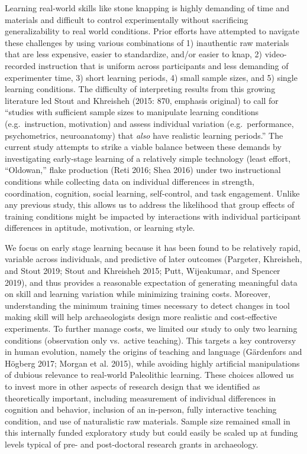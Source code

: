 \documentclass[smallextended]{svjour3}       %
\begin{document}
Learning real-world skills like stone knapping is highly demanding of
time and materials and difficult to control experimentally without
sacrificing generalizability to real world conditions. Prior efforts
have attempted to navigate these challenges by using various
combinations of 1) inauthentic raw materials that are less expensive,
easier to standardize, and/or easier to knap, 2) video-recorded
instruction that is uniform across participants and less demanding of
experimenter time, 3) short learning periods, 4) small sample sizes, and
5) single learning conditions. The difficulty of interpreting results
from this growing literature led Stout and Khreisheh (2015: 870,
emphasis original) to call for ``studies with sufficient sample sizes to
manipulate learning conditions (e.g.~instruction, motivation) and assess
individual variation (e.g.~performance, psychometrics, neuroanatomy)
that \emph{also} have realistic learning periods.'' The current study
attempts to strike a viable balance between these demands by
investigating early-stage learning of a relatively simple technology
(least effort, ``Oldowan,'' flake production (Reti 2016; Shea 2016)
under two instructional conditions while collecting data on individual
differences in strength, coordination, cognition, social learning,
self-control, and task engagement. Unlike any previous study, this
allows us to address the likelihood that group effects of training
conditions might be impacted by interactions with individual participant
differences in aptitude, motivation, or learning style.

We focus on early stage learning because it has been found to be
relatively rapid, variable across individuals, and predictive of later
outcomes (Pargeter, Khreisheh, and Stout 2019; Stout and Khreisheh 2015;
Putt, Wijeakumar, and Spencer 2019), and thus provides a reasonable
expectation of generating meaningful data on skill and learning
variation while minimizing training costs. Moreover, understanding the
minimum training times necessary to detect changes in tool making skill
will help archaeologists design more realistic and cost-effective
experiments. To further manage costs, we limited our study to only two
learning conditions (observation only vs.~active teaching). This targets
a key controversy in human evolution, namely the origins of teaching and
language (Gärdenfors and Högberg 2017; Morgan et al. 2015), while
avoiding highly artificial manipulations of dubious relevance to
real-world Paleolithic learning. These choices allowed us to invest more
in other aspects of research design that we identified as theoretically
important, including measurement of individual differences in cognition
and behavior, inclusion of an in-person, fully interactive teaching
condition, and use of naturalistic raw materials. Sample size remained
small in this internally funded exploratory study but could easily be
scaled up at funding levels typical of pre- and post-doctoral research
grants in archaeology.
\end{document}
